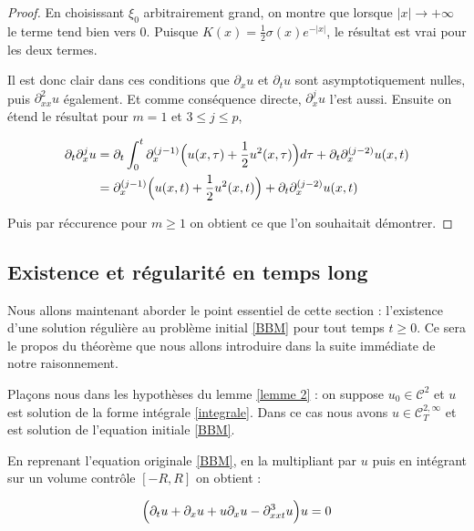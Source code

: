 \begin{proof}
    En choisissant $\xi_0$ arbitrairement grand, on montre que lorsque $|x| \longrightarrow +\infty$ le terme tend bien vers $0$.
    Puisque $K(x) = \frac{1}{2}\sigma(x)e^{-|x|}$, le résultat est vrai pour les deux termes. 

    Il est donc clair dans ces conditions que $\partial_x u$ et $\partial_t u$ sont asymptotiquement nulles, puis $\partial_{xx}^2 u$ également.
    Et comme conséquence directe, $\partial_x ^{j}u$ l'est aussi.
    Ensuite on étend le résultat pour $m = 1$ et $3 \leq j \leq p$,

    \begin{equation*}
    \begin{split}
        \partial_t \partial_x^j u &= \partial_t \int_{0}^{t} \partial_{x}^{(j-1)} \Bigl( u(x,\tau) + \frac{1}{2} u^2(x,\tau) \Bigr) d\tau + \partial _t\partial_x^{(j-2)} u(x,t) \\
        &= \partial_{x}^{(j-1)} \Bigl( u(x,t) + \frac{1}{2} u^2(x,t) \Bigr) + \partial _t\partial_x^{(j-2)} u(x,t)
    \end{split}
    \end{equation*}

    Puis par réccurence pour $m \geq 1$ on obtient ce que l'on souhaitait démontrer.

\end{proof}


\vspace{1em}

\subsection{Existence et régularité en temps long}

Nous allons maintenant aborder le point essentiel de cette section : l'existence d'une solution régulière au problème initial \ref{BBM} pour tout temps $t \geq 0$.
Ce sera le propos du théorème que nous allons introduire dans la suite immédiate de notre raisonnement.

Plaçons nous dans les hypothèses du lemme \ref{lemme 2} : on suppose $u_0 \in \mathcal{C}^2$ et $u$ est solution de la forme intégrale \ref{integrale}.
Dans ce cas nous avons $u \in \mathcal{C}_T^{2,\infty}$ et est solution de l'equation initiale \ref{BBM}.

En reprenant l'equation originale \ref{BBM}, en la multipliant par $u$ puis en intégrant sur un volume contrôle $[-R,R]$ on obtient :

$$\Bigl( \partial_t u + \partial_x u + u\partial_xu - \partial_{xxt}^3u \Bigr)u = 0$$

